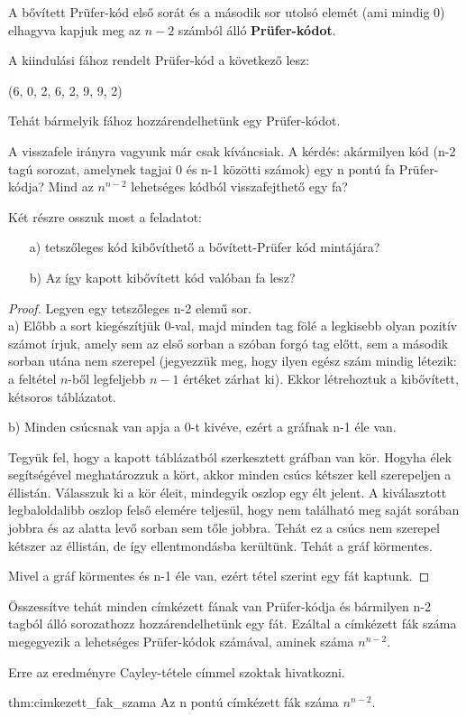 \begin{solution}
A bővített Prüfer-kód első sorát és a második sor utolsó elemét (ami
mindig 0) elhagyva kapjuk meg az $n-2$ számból álló \textbf{Prüfer-kódot}.

A kiindulási fához rendelt Prüfer-kód a következő lesz: 
\begin{center}
	(6, 0, 2, 6, 2, 9, 9, 2) 
	\par\end{center}

Tehát bármelyik fához hozzárendelhetünk egy Prüfer-kódot.

A visszafele irányra vagyunk már csak kíváncsiak. A kérdés: akármilyen
kód (n-2 tagú sorozat, amelynek tagjai 0 és n-1 közötti számok) egy
n pontú fa Prüfer-kódja? Mind az $n^{n-2}$ lehetséges kódból visszafejthető
egy fa?

Két részre osszuk most a feladatot:
\begin{itemize}
	\item[a)] tetszőleges kód kibővíthető a bővített-Prüfer kód mintájára? 
	\item[b)] Az így kapott kibővített kód valóban fa lesz? 
\end{itemize}
\begin{proof}
	Legyen egy tetszőleges n-2 elemű sor.\\
	a) Előbb a sort kiegészítjük 0-val, majd minden tag fölé a legkisebb
	olyan pozitív számot írjuk, amely sem az első sorban a szóban forgó
	tag előtt, sem a második sorban utána nem szerepel (jegyezzük meg,
	hogy ilyen egész szám mindig létezik: a feltétel $n$-ből legfeljebb
	$n-1$ értéket zárhat ki). Ekkor létrehoztuk a kibővített, kétsoros
	táblázatot.
	
	b) Minden csúcsnak van apja a 0-t kivéve, ezért a gráfnak n-1 éle
	van.
	
	Tegyük fel, hogy a kapott táblázatból szerkesztett gráfban van kör.
	Hogyha élek segítségével meghatározzuk a kört, akkor minden csúcs
	kétszer kell szerepeljen a éllistán. Válasszuk ki a kör éleit, mindegyik
	oszlop egy élt jelent. A kiválasztott legbaloldalibb oszlop felső
	elemére teljesül, hogy nem található meg saját sorában jobbra és az
	alatta levő sorban sem tőle jobbra. Tehát ez a csúcs nem szerepel
	kétszer az éllistán, de így ellentmondásba kerültünk. Tehát a gráf
	körmentes.
	
	Mivel a gráf körmentes és n-1 éle van, ezért tétel szerint egy fát
	kaptunk. 
\end{proof}
Összessítve tehát minden címkézett fának van Prüfer-kódja és bármilyen
n-2 tagból álló sorozathozz hozzárendelhetünk egy fát. Ezáltal a címkézett
fák száma megegyezik a lehetséges Prüfer-kódok számával, aminek száma
$n^{n-2}$.
\end{solution}
Erre az eredményre Cayley-tétele címmel szoktak hivatkozni. 
\begin{theorem}{thm:cimkezett_fak_szama}
	Az n pontú címkézett fák száma $n^{n-2}$. 
\end{theorem}


